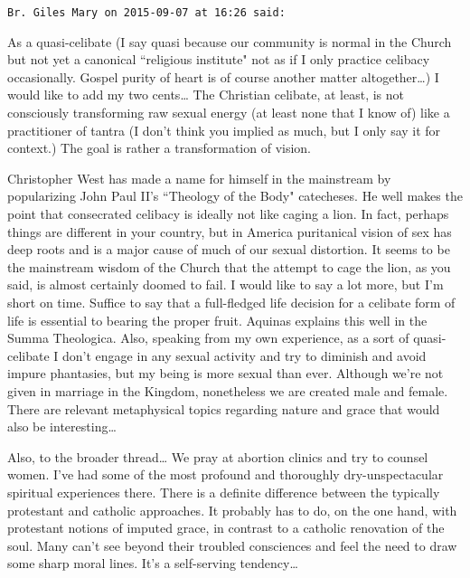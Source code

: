 \begin{footnotesize}\begin{sffamily}



\texttt{Br. Giles Mary on 2015-09-07 at 16:26 said: }

As a quasi-celibate (I say quasi because our community is normal in the Church but not yet a canonical ``religious institute" not as if I only practice celibacy occasionally. Gospel purity of heart is of course another matter altogether…) I would like to add my two cents… The Christian celibate, at least, is not consciously transforming raw sexual energy (at least none that I know of) like a practitioner of tantra (I don't think you implied as much, but I only say it for context.) The goal is rather a transformation of vision. 

Christopher West has made a name for himself in the mainstream by popularizing John Paul II's ``Theology of the Body" catecheses. He well makes the point that consecrated celibacy is ideally not like caging a lion. In fact, perhaps things are different in your country, but in America puritanical vision of sex has deep roots and is a major cause of much of our sexual distortion. It seems to be the mainstream wisdom of the Church that the attempt to cage the lion, as you said, is almost certainly doomed to fail. I would like to say a lot more, but I'm short on time. Suffice to say that a full-fledged life decision for a celibate form of life is essential to bearing the proper fruit. Aquinas explains this well in the Summa Theologica. Also, speaking from my own experience, as a sort of quasi-celibate I don't engage in any sexual activity and try to diminish and avoid impure phantasies, but my being is more sexual than ever. Although we're not given in marriage in the Kingdom, nonetheless we are created male and female. There are relevant metaphysical topics regarding nature and grace that would also be interesting…

Also, to the broader thread… We pray at abortion clinics and try to counsel women. I've had some of the most profound and thoroughly dry-unspectacular spiritual experiences there. There is a definite difference between the typically protestant and catholic approaches. It probably has to do, on the one hand, with protestant notions of imputed grace, in contrast to a catholic renovation of the soul. Many can't see beyond their troubled consciences and feel the need to draw some sharp moral lines. It's a self-serving tendency…



\end{sffamily}
\end{footnotesize}
